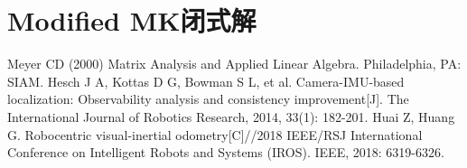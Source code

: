 \documentclass{article}
\begin{document}
\section{Modified MK闭式解}


\begin{thebibliography}{99}  
    Meyer CD (2000) Matrix Analysis and Applied Linear Algebra. Philadelphia, PA: SIAM.
     Hesch J A, Kottas D G, Bowman S L, et al. Camera-IMU-based localization: Observability analysis and consistency improvement[J]. The International Journal of Robotics Research, 2014, 33(1): 182-201.
     Huai Z, Huang G. Robocentric visual-inertial odometry[C]//2018 IEEE/RSJ International Conference on Intelligent Robots and Systems (IROS). IEEE, 2018: 6319-6326.
\end{thebibliography}
\end{document}
